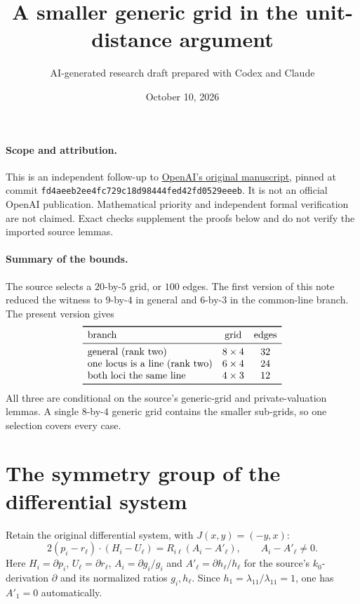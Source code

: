 \documentclass[11pt]{article}
\title{A smaller generic grid in the unit-distance argument}
\author{AI-generated research draft prepared with Codex and Claude}
\date{October 10, 2026}
\theoremstyle{remark}
\begin{document}
\maketitle
\paragraph{Scope and attribution.}
This is an independent follow-up to
\href{https://github.com/openai/math/tree/fd4aeeb2ee4fc729c18d98444fed42fd0529eeeb/preprints/A-power-saving-for-planar-unit-distances-September-23-2026}{OpenAI's original manuscript},
pinned at commit \texttt{fd4aeeb2ee4fc729c18d98444fed42fd0529eeeb}.
It is not an official OpenAI publication. Mathematical priority and
independent formal verification are not claimed. Exact checks supplement
the proofs below and do not verify the imported source lemmas.

\paragraph{Summary of the bounds.}
The source selects a $20$-by-$5$ grid, or $100$ edges. The first
version of this note reduced the witness to $9$-by-$4$ in general and
$6$-by-$3$ in the common-line branch. The present version gives
\[
 \begin{array}{lcc}
 \toprule
 \text{branch} & \text{grid} & \text{edges}\\
 \midrule
 \text{general (rank two)} & 8\times4 & 32\\
 \text{one locus is a line (rank two)} & 6\times4 & 24\\
 \text{both loci the same line} & 4\times3 & 12\\
 \bottomrule
 \end{array}
\]
All three are conditional on the source's generic-grid and
private-valuation lemmas. A single $8$-by-$4$ generic grid contains the
smaller sub-grids, so one selection covers every case.

\section{The symmetry group of the differential system}
\label{sec:symmetries}
Retain the original differential system, with $J(x,y)=(-y,x)$:
\begin{equation}\label{eq:system}
 2(p_i-r_\ell)\cdot(H_i-U_\ell)
   =R_{i\ell}(A_i-A'_\ell),\qquad A_i-A'_\ell\ne0 .
\end{equation}
Here $H_i=\partial p_i$, $U_\ell=\partial r_\ell$,
$A_i=\partial g_i/g_i$ and $A'_\ell=\partial h_\ell/h_\ell$ for the
source's $k_0$-derivation $\partial$ and its normalized ratios
$g_i,h_\ell$. Since $h_1=\lambda_{11}/\lambda_{11}=1$, one has
$A'_1=0$ automatically.
\end{document}
